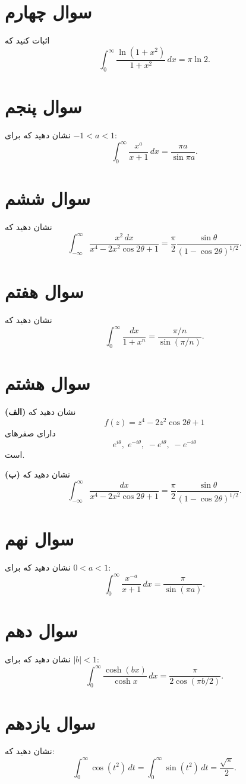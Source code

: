 \documentclass[a4paper,16pt]{article}
\begin{document}
	\section{سوال چهارم}
	اثبات کنید که
	\[
	\int_0^\infty \frac{\ln(1+x^2)}{1+x^2}\, dx = \pi \ln 2.
	\]
	\section{سوال پنجم}
	نشان دهید که برای \(-1 < a < 1\):
	\[
	\int_0^\infty \frac{x^a}{x+1}\, dx = \frac{\pi a}{\sin \pi a}.
	\]  
	
	\section{سوال ششم}
	نشان دهید که
	\[
	\int_{-\infty}^\infty \frac{x^2 \, dx}{x^4 - 2x^2 \cos 2\theta + 1} = \frac{\pi}{2} \frac{\sin \theta}{(1 - \cos 2\theta)^{1/2}}.
	\]  
	
	\section{سوال هفتم}
	نشان دهید که
	\[
	\int_0^{\infty} \frac{dx}{1+x^n} = \frac{\pi/n}{\sin(\pi/n)}.
	\]  
	\section{سوال هشتم}
	\textbf{(الف)} نشان دهید که
	\[
	f(z) = z^4 - 2 z^2 \cos 2\theta + 1
	\]  
	دارای صفرهای
	\[
	e^{i\theta}, \; e^{-i\theta}, \; -e^{i\theta}, \; -e^{-i\theta}
	\]  
	است.  
	
	\textbf{(ب)} نشان دهید که
	\[
	\int_{-\infty}^\infty \frac{dx}{x^4 - 2x^2 \cos 2\theta + 1} = \frac{\pi}{2} \frac{\sin \theta}{(1 - \cos 2\theta)^{1/2}}.
	\]  
	\section{سوال نهم}
	
	نشان دهید که برای \(0 < a < 1\):
	\[
	\int_0^\infty \frac{x^{-a}}{x+1}\, dx = \frac{\pi}{\sin(\pi a)}.
	\]  
	\section{سوال دهم}
	
	نشان دهید که برای \(|b| < 1\):
	\[
	\int_0^\infty \frac{\cosh(bx)}{\cosh x}\, dx = \frac{\pi}{2 \cos(\pi b/2)}.
	\]  
	\section{سوال یازدهم}
	نشان دهید که:
	\[
	\int_0^\infty \cos(t^2)\, dt = \int_0^\infty \sin(t^2)\, dt = \frac{\sqrt{\pi}}{2}.
	\]  
\end{document}
